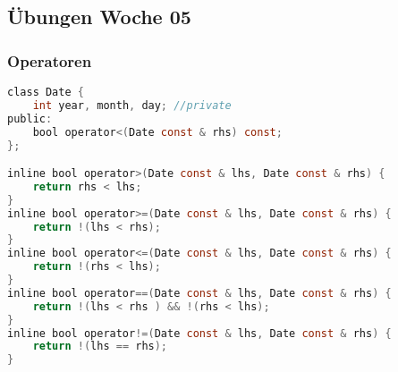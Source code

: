 
\subsection{Übungen Woche 05}
\subsubsection{Operatoren}
\begin{lstlisting}[style=frame, style= linenumbers, language=C]
class Date {
    int year, month, day; //private
public:
    bool operator<(Date const & rhs) const;
};

inline bool operator>(Date const & lhs, Date const & rhs) {
    return rhs < lhs;
}
inline bool operator>=(Date const & lhs, Date const & rhs) {
    return !(lhs < rhs);
}
inline bool operator<=(Date const & lhs, Date const & rhs) {
    return !(rhs < lhs);
}
inline bool operator==(Date const & lhs, Date const & rhs) {
    return !(lhs < rhs ) && !(rhs < lhs);
}
inline bool operator!=(Date const & lhs, Date const & rhs) {
    return !(lhs == rhs);
}
\end{lstlisting}